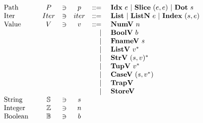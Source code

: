 \newpage
\begin{align*}
\begin{array}{lcccrlr}
%
  \text{Path}\quad& P &\ni& p &::=& ~ \idxp ~ e ~ | ~ \slicep ~ (e, e) ~ | ~ \dotp ~ s \\
%
  \text{Iter}\quad& Iter &\ni& iter &::=& ~ \listiter ~ | ~ \listniter ~ e ~|~ \listidxiter ~ (s, e) \\
%
  \text{Value}\quad& V &\ni& v &::=& ~ \numv ~ n \\
    &&&& | & ~ \boolv ~ b \\
    &&&& | & ~ \fnamev ~ s \\
    &&&& | & ~ \listv ~ \seq v \\
    &&&& | & ~ \strv ~ \seq{(s, v)} \\
    &&&& | & ~ \tupv ~ \seq v \\
    &&&& | & ~ \casev ~ (s, \seq v) \\
    &&&& | & ~ \trapv \\
    &&&& | & ~ \storev \\
  \text{String}\quad& \mathbb S &\ni& s \\
  \text{Integer}\quad& \mathbb Z &\ni& n \\
  \text{Boolean}\quad& \mathbb B &\ni& b \\
\end{array}
\end{align*}

